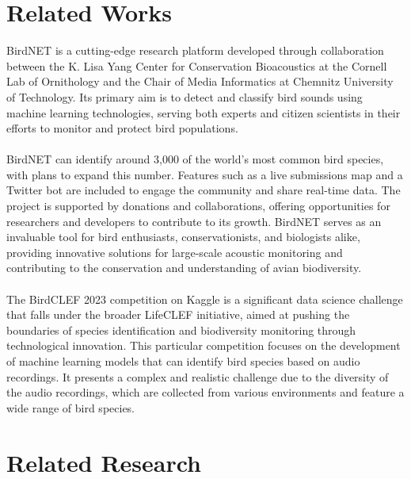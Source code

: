 \section{Related Works}
BirdNET is a cutting-edge research platform developed through collaboration between the K. Lisa Yang Center for Conservation Bioacoustics at the Cornell Lab of Ornithology and the Chair of Media Informatics at Chemnitz University of Technology. Its primary aim is to detect and classify bird sounds using machine learning technologies, serving both experts and citizen scientists in their efforts to monitor and protect bird populations.\\\\
BirdNET can identify around 3,000 of the world's most common bird species, with plans to expand this number. Features such as a live submissions map and a Twitter bot are included to engage the community and share real-time data. The project is supported by donations and collaborations, offering opportunities for researchers and developers to contribute to its growth. BirdNET serves as an invaluable tool for bird enthusiasts, conservationists, and biologists alike, providing innovative solutions for large-scale acoustic monitoring and contributing to the conservation and understanding of avian biodiversity.\\\\
The BirdCLEF 2023 competition on Kaggle is a significant data science challenge that falls under the broader LifeCLEF initiative, aimed at pushing the boundaries of species identification and biodiversity monitoring through technological innovation. This particular competition focuses on the development of machine learning models that can identify bird species based on audio recordings. It presents a complex and realistic challenge due to the diversity of the audio recordings, which are collected from various environments and feature a wide range of bird species.
\section{Related Research}

